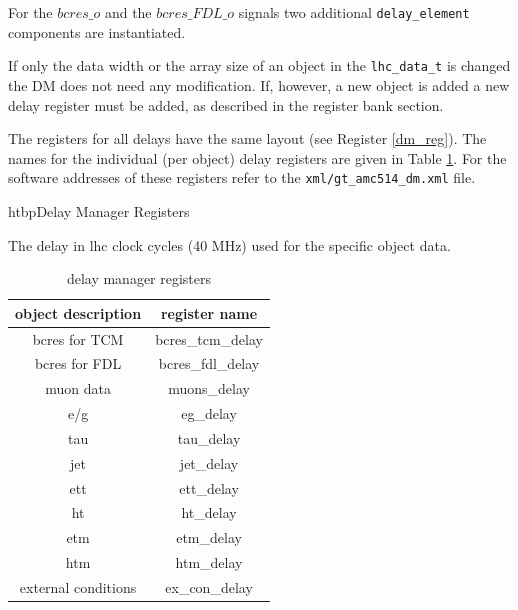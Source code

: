 For the $bcres\_o$ and the $bcres\_FDL\_o$ signals two additional \texttt{delay\_element} components are instantiated. 

If only the data width or the array size of an object in the \texttt{lhc\_data\_t} is changed the DM does not need any modification. If, however, a new object is added a 
new delay register must be added, as described in the register bank section. 

The registers for all delays have the same layout (see Register \ref{dm_reg}). The names for the individual (per object) delay registers are given in Table \ref{tab_dm_regs}. 
For the software addresses of these registers refer to the \texttt{xml/gt\_amc514\_dm.xml} file.

\begin{register}{htbp}{Delay Manager Registers}{}%
	\label{dm_reg}
	\begin{regdesc}
	\begin{reglist}
		\item [delay] The delay in lhc clock cycles (40 MHz) used for the specific object data.
	\end{reglist}
	\end{regdesc}
\end{register}

\begin{table}[h]
\vspace{5mm}
\begin{center}
\begin{tabular}{|c|c|}
\hline
object description & register name \\ \hline  \hline
bcres for TCM & bcres\_tcm\_delay \\ \hline
bcres for FDL & bcres\_fdl\_delay  \\ \hline
muon data & muons\_delay  \\ \hline
e/g & eg\_delay  \\ \hline
tau & tau\_delay \\ \hline
jet & jet\_delay  \\ \hline
ett & ett\_delay  \\ \hline
ht & ht\_delay  \\ \hline
etm & etm\_delay  \\ \hline
htm & htm\_delay  \\ \hline
external conditions & ex\_con\_delay  \\ \hline
\end{tabular}
\end{center}
\caption{delay manager registers}
\label{tab_dm_regs}
\end{table}

